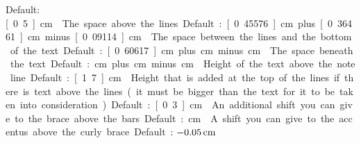Default: \unit[0.5]{cm}

The space above the lines.  

Default: \unit[0.45576]{cm} plus \unit[0.36461]{cm} minus \unit[0.09114]{cm}

The space between the lines and the bottom of the text.  

Default: \unit[0.60617]{cm} plus \unit[0]{cm} minus \unit[0]{cm}

The space beneath the text.  

Default: \unit[0]{cm} plus \unit[0]{cm} minus \unit[0]{cm}

Height of the text above the note line.  

Default: \unit[1.7]{cm}

Height that is added at the top of the lines if there is text above the lines (it must be bigger than the text for it to be taken into consideration).  

Default: \unit[0.3]{cm}

An additional shift you can give to the brace above the bars.  

Default: \unit[0]{cm}

A shift you can give to the accentus above the curly brace.  

Default: $\unit[-0.05]{cm}$

